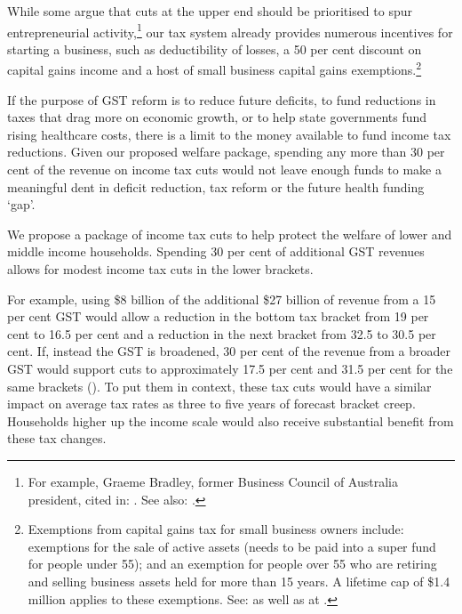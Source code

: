 While some argue that cuts at the upper end should be prioritised to spur entrepreneurial activity,\footnote{For example, Graeme Bradley, former Business Council of Australia president, cited in: \textcite{BaloghHepworth2015}. See also: \textcite{Hockey2015d}.}  our tax system already provides numerous incentives for starting a business, such as deductibility of losses, a 50 per cent discount on capital gains income and a host of small business capital gains exemptions.\footnote{Exemptions from capital gains tax for small business owners include: 
 exemptions for the sale of active assets (needs to be paid into a super fund for people under 55); and an exemption for people over 55 who are retiring and selling business assets held for more than 15 years. A lifetime cap of \$1.4 million applies to these exemptions. See: \textcite{ATO2014f} as well as  at \pageref{paragraph:SUPER-lifetime-CGT-cap}.
}  

If the purpose of GST reform is to reduce future deficits, to fund reductions in taxes that drag more on economic growth, or to help state governments fund rising healthcare costs, there is a limit to the money available to fund income tax reductions. Given our proposed welfare package, spending any more than 30 per cent of the revenue on income tax cuts would not leave enough funds to make a meaningful dent in deficit reduction, tax reform or the future health funding ‘gap’. 

We propose a package of income tax cuts to help protect the welfare of lower and middle income households. Spending 30 per cent of additional GST revenues allows for modest income tax cuts in the lower brackets. 


For example, using \$8 billion of the additional \$27 billion of revenue from a 15 per cent GST would allow a reduction in the bottom tax bracket from 19 per cent to 16.5 per cent and a reduction in the next bracket from 32.5 to 30.5 per cent. If, instead the GST is broadened, 30 per cent of the revenue from a broader GST would support cuts to approximately 17.5 per cent and 31.5 per cent for the same brackets (). To put them in context, these tax cuts would have a similar impact on average tax rates as three to five years of forecast bracket creep.  Households higher up the income scale would also receive substantial benefit from these tax changes. 

